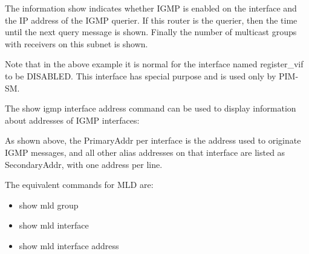 The information show indicates whether IGMP is enabled on the
interface and the IP address of the IGMP querier.  If this router is
the querier, then the time until the next query message is shown.
Finally the number of multicast groups with receivers on this subnet
is shown.

Note that in the above example it is normal for the interface named
{\stt register\_vif} to be {\stt DISABLED}. This interface has special
purpose and is used only by PIM-SM.

\vspace{0.1in}
The {\stt show igmp interface address} command can be used to display
information about addresses of IGMP interfaces:

\vspace{0.1in}
\noindent{}
\vspace{0.1in}

As shown above, the {\stt PrimaryAddr} per interface is the address
used to originate IGMP messages, and all other alias addresses on that
interface are listed as {\stt SecondaryAddr}, with one address per
line.

The equivalent commands for MLD are:
\begin{itemize}
\item {\stt show mld group}
\item {\stt show mld interface}
\item {\stt show mld interface address}
\end{itemize}
